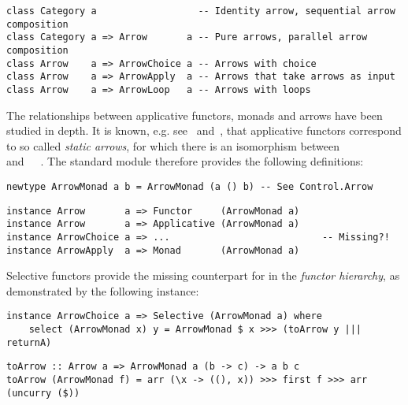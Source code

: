 \vspace{1mm}
\begin{verbatim}
class Category a                  -- Identity arrow, sequential arrow composition
class Category a => Arrow       a -- Pure arrows, parallel arrow composition
class Arrow    a => ArrowChoice a -- Arrows with choice
class Arrow    a => ArrowApply  a -- Arrows that take arrows as input
class Arrow    a => ArrowLoop   a -- Arrows with loops
\end{verbatim}
\vspace{1mm}

\noindent
The relationships between applicative functors, monads and arrows have been
studied in depth. It is known, e.g. see~\citet{lindley2011idioms}
and~\citet{rivas2017notions}, that applicative functors correspond to so called
\emph{static arrows}, for which there is an isomorphism between
~\hs{()}~\hs{(}~\hs{->}~ and~~~. The
standard module  therefore provides the following
definitions:

\vspace{1mm}
\begin{verbatim}
newtype ArrowMonad a b = ArrowMonad (a () b) -- See Control.Arrow
\end{verbatim}
\vspace{1mm}
\begin{verbatim}
instance Arrow       a => Functor     (ArrowMonad a)
instance Arrow       a => Applicative (ArrowMonad a)
instance ArrowChoice a => ...                           -- Missing?!
instance ArrowApply  a => Monad       (ArrowMonad a)
\end{verbatim}
\vspace{1mm}

\noindent
Selective functors provide the missing counterpart for  in the
\emph{functor hierarchy}, as demonstrated by the following instance:

\vspace{1mm}
\begin{verbatim}
instance ArrowChoice a => Selective (ArrowMonad a) where
    select (ArrowMonad x) y = ArrowMonad $ x >>> (toArrow y ||| returnA)
\end{verbatim}
\vspace{1mm}
\begin{verbatim}
toArrow :: Arrow a => ArrowMonad a (b -> c) -> a b c
toArrow (ArrowMonad f) = arr (\x -> ((), x)) >>> first f >>> arr (uncurry ($))
\end{verbatim}
\vspace{1mm}

